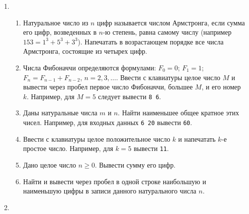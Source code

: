 \documentclass{article}
\begin{document}
\begin{enumerate}[label={}, leftmargin=0pt, itemindent=0pt]
\hrulefill
\item
\begin{enumerate}[label=\arabic{enumi}.\arabic*.]
\item
Натуральное число из $n$ цифр называется числом Армстронга, если сумма его цифр, возведенных в $n$-ю степень, равна самому числу (например $153=1^3+5^3+3^3$). Напечатать в возрастающем порядке все числа Армстронга, состоящие из четырех цифр.
\item
Числа Фибоначчи определяются формулами:
$F_0=0$; $F_1=1$; $F_n=F_{n-1}+F_{n-2}$, $n=2,3,\dots$. 
Ввести с клавиатуры целое число $M$ и вывести через пробел первое число Фибоначчи, большее $M$, и его номер $k$. Например, для $M=5$ следует вывести \texttt{8 6}.
\item
Даны натуральные числа $m$ и $n$. Найти наименьшее общее кратное этих чисел. Например, для входных данных \texttt{6 20} вывести \texttt{60}.
\item
Ввести с клавиатуры целое положительное число $k$ и напечатать $k$-е простое число. Например, для $k=5$ вывести \texttt{11}.
\item
Дано целое число $n\geqslant 0$. Вывести сумму его цифр.
\item
Найти и вывести через пробел в одной строке наибольшую и наименьшую цифры в записи данного натурального числа $n$.
\end{enumerate}
\hrulefill


\item


\end{enumerate}
\end{document}
